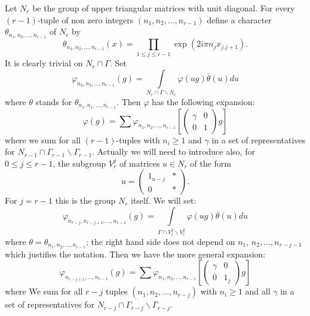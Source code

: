 Let $N_{r}$ be the group of upper triangular matrices with unit diagonal. For every $(r-1)$-tuple of non zero integers $(n_{1},n_{2},\ldots,n_{r-1})$ define a character $\theta_{n_{1},n_{2},\ldots,n_{r-1}}$ of $N_{r}$ by
\begin{equation*}
\theta_{n_{1},n_{2},\ldots,n_{r-1}}(x)=\prod\limits_{1\leq j\leq r-1}\exp (2i\pi n_{j}x_{j.j+1}).\tag{3.1}\label{art5-eq3.1}
\end{equation*}
It is clearly trivial on $N_{r}\cap \Gamma$. Set
\begin{equation*}
\varphi_{n_{2},n_{2},\ldots,n_{r-1}}(g)=\int\limits_{N_{r}\cap \Gamma\backslash N_{r}}\varphi(ug)\overline{\theta}(u)du\tag{3.2}\label{art5-eq3.2}
\end{equation*}
where $\theta$ stands for $\theta_{n_{1},n_{1},\ldots,n_{r-1}}$. Then $\varphi$ has the following expansion:
\begin{equation*}
\varphi(g)=\sum \varphi_{n_{1},n_{2},\ldots,n_{r-1}}\left[\left(\begin{matrix} \gamma & 0\\ 0 & 1\end{matrix}\right)g\right]\tag{3.3}\label{art5-eq3.3}
\end{equation*}
where we sum for all $(r-1)$-tuples with $n_{i}\geq 1$ and $\gamma$ in a set of representatives for $N_{r-1}\cap \Gamma_{r-1}\backslash \Gamma_{r-1}$. Actually we will need to introduce also, for $0\leq j\leq r-1$, the subgroup $V^{j}_{r}$ of matrices $u\in N_{r}$ of the form
$$
u=\left(\begin{matrix} 1_{n-j} & *\\
0 & *
\end{matrix}
\right).
$$
For $j=r-1$ this is the group $N_{r}$ itself. We will set:
$$
\varphi_{n_{r-j},n_{r-j+1},\ldots,n_{r-1}}(g)=\int\limits_{\Gamma\cap V^{j}_{r}\backslash V^{j}_{r}}\varphi(ug)\overline{\theta}(u)du
$$
where $\theta=\theta_{n_{1},n_{2},\ldots,n_{r-1}}$; the right hand side does not depend on $n_{1}$, $n_{2},\ldots,n_{r-j-1}$ which justifies the notation. Then we have the more general expansion:
\begin{equation*}
\varphi_{n_{r-j+1},\ldots,n_{r-1}}(g)=\sum \varphi_{n_{1},n_{2},\ldots,n_{r-1}}\left[\left(\begin{matrix} \gamma & 0\\ 0 & 1_{j}\end{matrix}\right)g\right]
\end{equation*}
where We sum for all $r-j$ tuples $(n_{1},n_{2},\ldots,n_{r-j})$ with $n_{i}\geq 1$ and all $\gamma$ in a set of representatives for $N_{r-j}\cap \Gamma_{r-j}\backslash \Gamma_{r-j}$.

